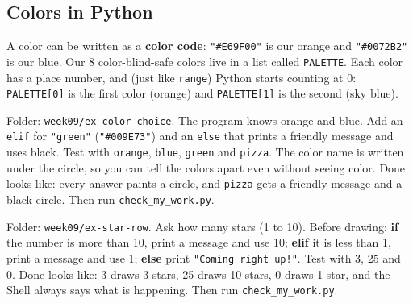 \subsection{Colors in Python}
A color can be written as a \textbf{color code}: \texttt{"\#E69F00"} is our orange and \texttt{"\#0072B2"} is our blue. Our 8 color-blind-safe colors live in a list called \texttt{PALETTE}. Each color has a place number, and (just like \texttt{range}) Python starts counting at 0: \texttt{PALETTE[0]} is the first color (orange) and \texttt{PALETTE[1]} is the second (sky blue).

\begin{exercise}
Folder: \texttt{week09/ex-color-choice}. The program knows orange and blue. Add an \texttt{elif} for \texttt{"green"} (\texttt{"\#009E73"}) and an \texttt{else} that prints a friendly message and uses black. Test with \texttt{orange}, \texttt{blue}, \texttt{green} and \texttt{pizza}. The color name is written under the circle, so you can tell the colors apart even without seeing color.
Done looks like: every answer paints a circle, and \texttt{pizza} gets a friendly message and a black circle. Then run \texttt{check\_my\_work.py}.
\end{exercise}

\begin{exercise}
Folder: \texttt{week09/ex-star-row}. Ask how many stars (1 to 10). Before drawing: \textbf{if} the number is more than 10, print a message and use 10; \textbf{elif} it is less than 1, print a message and use 1; \textbf{else} print \texttt{"Coming right up!"}. Test with 3, 25 and 0.
Done looks like: 3 draws 3 stars, 25 draws 10 stars, 0 draws 1 star, and the Shell always says what is happening. Then run \texttt{check\_my\_work.py}.
\end{exercise}

